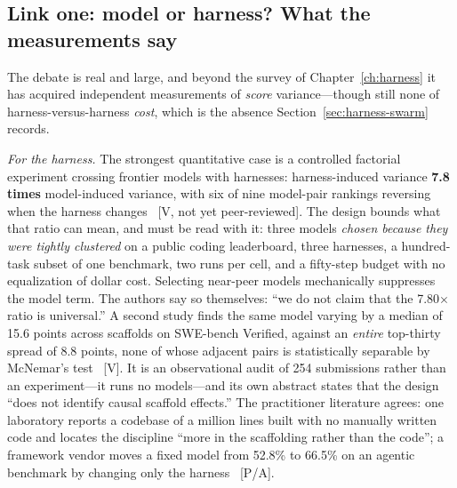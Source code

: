 \subsection{Link one: model or harness? What the measurements say}

The debate is real and large, and beyond the survey of Chapter~\ref{ch:harness} it has acquired independent measurements of \emph{score} variance---though still none of harness-versus-harness \emph{cost}, which is the absence Section~\ref{sec:harness-swarm} records.

\emph{For the harness.} The strongest quantitative case is a controlled factorial experiment crossing frontier models with harnesses: harness-induced variance \textbf{7.8 times} model-induced variance, with six of nine model-pair rankings reversing when the harness changes~\cite{harness-variance} [V, not yet peer-reviewed]. The design bounds what that ratio can mean, and must be read with it: three models \emph{chosen because they were tightly clustered} on a public coding leaderboard, three harnesses, a hundred-task subset of one benchmark, two runs per cell, and a fifty-step budget with no equalization of dollar cost. Selecting near-peer models mechanically suppresses the model term. The authors say so themselves: ``we do not claim that the 7.80$\times$ ratio is universal.'' A second study finds the same model varying by a median of 15.6 points across scaffolds on SWE-bench Verified, against an \emph{entire} top-thirty spread of 8.8 points, none of whose adjacent pairs is statistically separable by McNemar's test~\cite{scaffold-converged} [V]. It is an observational audit of 254 submissions rather than an experiment---it runs no models---and its own abstract states that the design ``does not identify causal scaffold effects.'' The practitioner literature agrees: one laboratory reports a codebase of a million lines built with no manually written code and locates the discipline ``more in the scaffolding rather than the code''; a framework vendor moves a fixed model from 52.8\% to 66.5\% on an agentic benchmark by changing only the harness~\cite{harness-engineering} [P/A].

